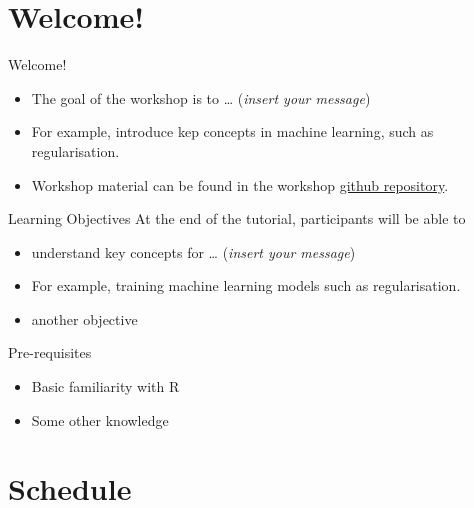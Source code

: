 \documentclass{beamer}
\newcommand{\tightlist}{%
  \setlength{\itemsep}{0pt}\setlength{\parskip}{0pt}}
\begin{document}
\section{Welcome!}\label{welcome}

\begin{frame}{Welcome!}
\begin{itemize}
\tightlist
\item
  The goal of the workshop is to \ldots{} (\emph{insert your message})
\item
  For example, introduce kep concepts in machine learning, such as
  regularisation.
\item
  Workshop material can be found in the workshop
  \href{https://github.com}{github repository}.
\end{itemize}

\begin{block}{Learning Objectives}
\label{learning-objectives}
At the end of the tutorial, participants will be able to

\begin{itemize}
\tightlist
\item
  understand key concepts for \ldots{} (\emph{insert your message})
\item
  For example, training machine learning models such as regularisation.
\item
  another objective
\end{itemize}
\end{block}

\begin{block}{Pre-requisites}
\label{pre-requisites}
\begin{itemize}
\tightlist
\item
  Basic familiarity with R
\item
  Some other knowledge
\end{itemize}
\end{block}
\end{frame}

\section{Schedule}\label{schedule}
\end{document}
